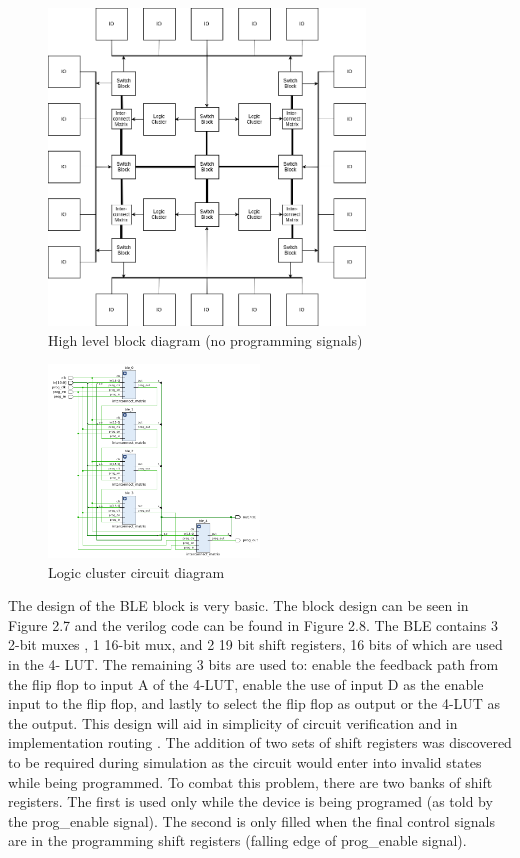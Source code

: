 \documentclass[12pt]{article}
\begin{document}
\begin{figure}[h]
    \centering
    \includegraphics[width=0.75\textwidth]{arch}
    \caption{High level block diagram (no programming signals)}
    \label{fig:arch}
\end{figure}

\begin{figure}[h]
    \centering
    \includegraphics[width=0.5\textwidth]{circuit_toplevel}
    \caption{Logic cluster circuit diagram}
    \label{fig:circuit_toplevel}
\end{figure}

The design of the BLE block is very basic. The block design can be seen in Figure 
2.7 and the verilog code can be found in Figure 2.8. The BLE contains 3 2-bit muxes
, 1 16-bit mux, and 2 19 bit shift registers, 16 bits of which are used in the 4-
LUT. The remaining 3 bits are used to: enable the feedback path from the flip flop 
to input A of the 4-LUT, enable the use of input D as the enable input to the flip 
flop, and lastly to select the flip flop as output or the 4-LUT as the output. This 
design will aid in simplicity of circuit verification and in implementation routing
. The addition of two sets of shift registers was discovered to be required during 
simulation as the circuit would enter into invalid states while being programmed. 
To combat this problem, there are two banks of shift registers. The first is used 
only while the device is being programed (as told by the prog{\_}enable signal). The 
second is only filled when the final control signals are in the programming shift 
registers (falling edge of prog{\_}enable signal).
\end{document}
